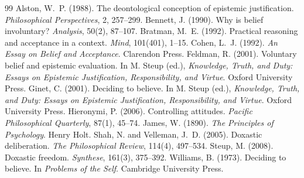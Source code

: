 \documentclass{situationist-preprint}
\begin{document}
\begin{thebibliography}{99}\small
{} Alston, W.~P. (1988). The deontological conception of epistemic justification. \emph{Philosophical Perspectives}, 2, 257--299.
 Bennett, J. (1990). Why is belief involuntary? \emph{Analysis}, 50(2), 87--107.
 Bratman, M.~E. (1992). Practical reasoning and acceptance in a context. \emph{Mind}, 101(401), 1--15.
 Cohen, L.~J. (1992). \emph{An Essay on Belief and Acceptance}. Clarendon Press.
 Feldman, R. (2001). Voluntary belief and epistemic evaluation. In M. Steup (ed.), \emph{Knowledge, Truth, and Duty: Essays on Epistemic Justification, Responsibility, and Virtue}. Oxford University Press.
 Ginet, C. (2001). Deciding to believe. In M. Steup (ed.), \emph{Knowledge, Truth, and Duty: Essays on Epistemic Justification, Responsibility, and Virtue}. Oxford University Press.
 Hieronymi, P. (2006). Controlling attitudes. \emph{Pacific Philosophical Quarterly}, 87(1), 45--74.
 James, W. (1890). \emph{The Principles of Psychology}. Henry Holt.
 Shah, N. and Velleman, J.~D. (2005). Doxastic deliberation. \emph{The Philosophical Review}, 114(4), 497--534.
 Steup, M. (2008). Doxastic freedom. \emph{Synthese}, 161(3), 375--392.
 Williams, B. (1973). Deciding to believe. In \emph{Problems of the Self}. Cambridge University Press.
\end{thebibliography}
\end{document}
